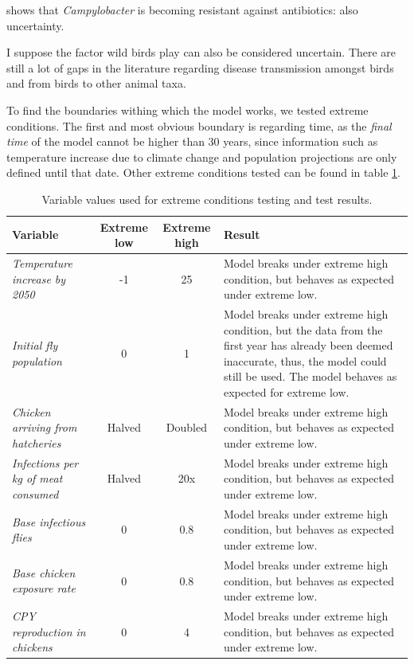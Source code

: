 \textcite{vlaanderen_staat_2019} shows that \textit{Campylobacter} is becoming resistant against antibiotics: also uncertainty.


I suppose the factor wild birds play can also be considered uncertain. There are still a lot of gaps in the literature regarding disease transmission amongst birds and from birds to other animal taxa.
\fi

To find the boundaries withing which the model works, we tested extreme conditions. The first and most obvious boundary is regarding time, as the \textit{final time} of the model cannot be higher than 30 years, since information such as temperature increase due to climate change and population projections are only defined until that date. Other extreme conditions tested can be found in table \ref{tab:extreme_values_results}.

\begin{longtable}[c]{m{8em} c c m{22em}}
\caption{Variable values used for extreme conditions testing and test results.}
\label{tab:extreme_values_results}\\
\hline
Variable & Extreme low & Extreme high & Result \\
\hline
\endfirsthead
%
\endhead

\textit{Temperature increase by 2050}   &   -1          &   25              &   Model breaks under extreme high condition, but behaves as expected under extreme low. \hline \\
\textit{Initial fly population}         &   0           &   1               &   Model breaks under extreme high condition, but the data from the first year has already been deemed inaccurate, thus, the model could still be used. The model behaves as expected for extreme low.   \hline \\
\textit{Chicken arriving from hatcheries} & Halved      &   Doubled         &   Model breaks under extreme high condition, but behaves as expected under extreme low. \hline \\
\textit{Infections per kg of meat consumed} &   Halved  &   20x             &   Model breaks under extreme high condition, but behaves as expected under extreme low. \hline \\
\textit{Base infectious flies}          &   0           &   0.8             &   Model breaks under extreme high condition, but behaves as expected under extreme low. \hline \\
\textit{Base chicken exposure rate}     &   0           &   0.8             &   Model breaks under extreme high condition, but behaves as expected under extreme low. \hline \\
\textit{CPY reproduction in chickens}   &   0           &   4               &   Model breaks under extreme high condition, but behaves as expected under extreme low. \\


\end{longtable}




